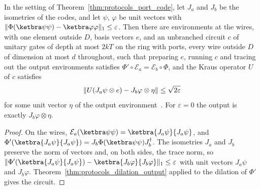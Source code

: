 \begin{theorem}
    \label{thm:protocols_port_output}
    \leanok
    In the setting of Theorem~\ref{thm:protocols_port_code}, let $J_a$ and $J_b$ be the
    isometries of the codes, and let $\psi$, $\varphi$ be unit vectors with
    $\lVert\Phi(\ketbra\psi\psi)-\ketbra\varphi\varphi\rVert_1\le\varepsilon$. Then there are
    environments at the wires, with one element outside $D$, basis vectors $e$, and an
    unbranched circuit $c$ of unitary gates of depth at most $2kT$ on the ring with ports,
    every wire outside $D$ of dimension at most $d$ throughout, such that preparing $e$,
    running $c$ and tracing out the output environments satisfies
    $\Phi'\circ\mathcal E_a=\mathcal E_b\circ\Phi$, and the Kraus operator $U$ of $c$ satisfies
    \begin{equation}
        \lVert U(J_a\psi\otimes e)-J_b\varphi\otimes\eta\rVert\le\sqrt{2\varepsilon}
        \notag
    \end{equation}
    for some unit vector $\eta$ of the output environment~\cite{Piroli2021LOCC}. For
    $\varepsilon=0$ the output is exactly $J_b\varphi\otimes\eta$.
\end{theorem}
\begin{proof}\leanok
    On the wires, $\mathcal E_a(\ketbra\psi\psi)=\ketbra{J_a\psi}{J_a\psi}$, and
    $\Phi'(\ketbra{J_a\psi}{J_a\psi})=J_b\Phi(\ketbra\psi\psi)J_b^\dagger$. The isometries
    $J_a$ and $J_b$ preserve the norm of vectors and, on both sides, the trace norm, so
    $\lVert\Phi'(\ketbra{J_a\psi}{J_a\psi})-\ketbra{J_b\varphi}{J_b\varphi}\rVert_1\le
    \varepsilon$ with unit vectors $J_a\psi$ and $J_b\varphi$. Theorem~\ref{thm:protocols_dilation_output}
    applied to the dilation of $\Phi'$ gives the circuit.
\end{proof}
